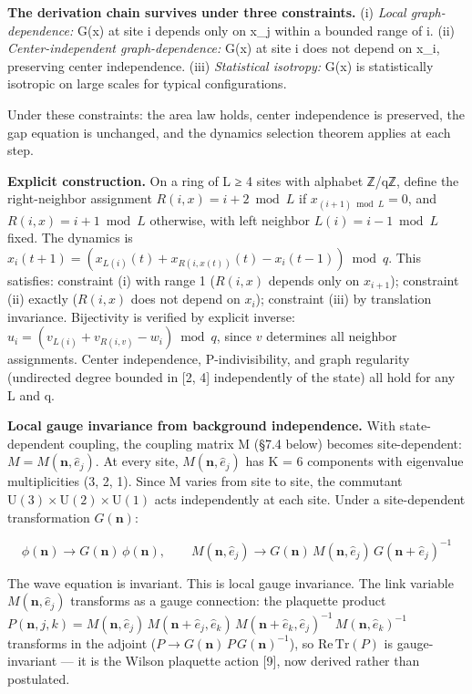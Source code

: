 \documentclass[
  11pt,
]{article}
\begin{document}
\textbf{The derivation chain survives under three constraints.} (i)
\emph{Local graph-dependence:} G(x) at site i depends only on x\_j
within a bounded range of i. (ii) \emph{Center-independent
graph-dependence:} G(x) at site i does not depend on x\_i, preserving
center independence. (iii) \emph{Statistical isotropy:} G(x) is
statistically isotropic on large scales for typical configurations.

Under these constraints: the area law holds, center independence is
preserved, the gap equation is unchanged, and the dynamics selection
theorem applies at each step.

\textbf{Explicit construction.} On a ring of L ≥ 4 sites with alphabet
ℤ/qℤ, define the right-neighbor assignment \(R(i, x) = i+2 \bmod L\) if
\(x_{(i+1) \bmod L} = 0\), and \(R(i, x) = i+1 \bmod L\) otherwise, with
left neighbor \(L(i) = i - 1 \bmod L\) fixed. The dynamics is
\(x_i(t+1) = (x_{L(i)}(t) + x_{R(i,x(t))}(t) - x_i(t-1)) \bmod q\). This
satisfies: constraint (i) with range 1 (\(R(i,x)\) depends only on
\(x_{i+1}\)); constraint (ii) exactly (\(R(i,x)\) does not depend on
\(x_i\)); constraint (iii) by translation invariance. Bijectivity is
verified by explicit inverse:
\(u_i = (v_{L(i)} + v_{R(i,v)} - w_i) \bmod q\), since \(v\) determines
all neighbor assignments. Center independence, P-indivisibility, and
graph regularity (undirected degree bounded in {[}2, 4{]} independently
of the state) all hold for any L and q.

\textbf{Local gauge invariance from background independence.} With
state-dependent coupling, the coupling matrix M (§7.4 below) becomes
site-dependent: \(M = M(\mathbf{n}, \hat{e}_j)\). At every site,
\(M(\mathbf{n}, \hat{e}_j)\) has K = 6 components with eigenvalue
multiplicities (3, 2, 1). Since M varies from site to site, the
commutant \(\mathrm{U}(3) \times \mathrm{U}(2) \times \mathrm{U}(1)\)
acts independently at each site. Under a site-dependent transformation
\(G(\mathbf{n})\):

\[\phi(\mathbf{n}) \to G(\mathbf{n})\,\phi(\mathbf{n}), \qquad M(\mathbf{n}, \hat{e}_j) \to G(\mathbf{n})\,M(\mathbf{n}, \hat{e}_j)\,G(\mathbf{n}+\hat{e}_j)^{-1}\]

The wave equation is invariant. This is local gauge invariance. The link
variable \(M(\mathbf{n}, \hat{e}_j)\) transforms as a gauge connection:
the plaquette product
\(P(\mathbf{n}, j, k) = M(\mathbf{n}, \hat{e}_j)\,M(\mathbf{n}+\hat{e}_j, \hat{e}_k)\,M(\mathbf{n}+\hat{e}_k, \hat{e}_j)^{-1}\,M(\mathbf{n}, \hat{e}_k)^{-1}\)
transforms in the adjoint
(\(P \to G(\mathbf{n})\,P\,G(\mathbf{n})^{-1}\)), so
\(\mathrm{Re\,Tr}(P)\) is gauge-invariant --- it is the Wilson plaquette
action {[}9{]}, now derived rather than postulated.
\end{document}
